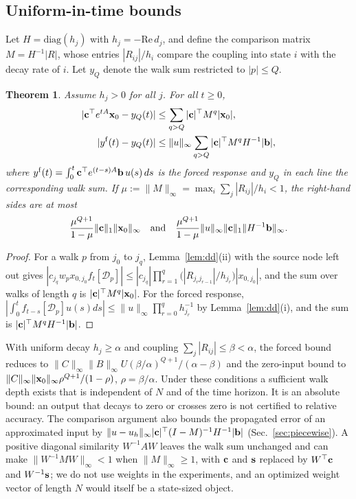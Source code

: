 \documentclass[aps,pra,superscriptaddress,floatfix,longbibliography,twocolumn]{revtex4-2}
\newcommand{\bx}{{\bf x}}
\newcommand{\bb}{{\bf b}}
\newcommand{\bc}{{\bf c}}
\newcommand{\bs}{{\bf s}}
\newtheorem{theorem}{Theorem}
\begin{document}
\subsection{Uniform-in-time bounds}
Let $H=\mathrm{diag}(h_j)$ with $h_j=-\mathrm{Re}\,d_j$, and define the comparison matrix $M=H^{-1}|R|$, whose entries $|R_{ij}|/h_i$ compare the coupling into state $i$ with the decay rate of $i$. Let $y_Q$ denote the walk sum restricted to $|p|\le Q$.
\begin{theorem}\label{thm:uniform}
Assume $h_j>0$ for all $j$. For all $t\ge0$,
\begin{align}
|\bc^\top e^{tA}\bx_0-y_Q(t)|&\le\sum_{q>Q}|\bc|^\top M^q|\bx_0|,\label{eq:uni_zi}\\
|y^{\rm f}(t)-y_Q(t)|&\le\|u\|_\infty\sum_{q>Q}|\bc|^\top M^qH^{-1}|\bb|,\label{eq:uni_f}
\end{align}
where $y^{\rm f}(t)=\int_0^t\bc^\top e^{(t-s)A}\bb\,u(s)\,ds$ is the forced response and $y_Q$ in each line the corresponding walk sum.
If $\mu:=\|M\|_\infty=\max_i\sum_j|R_{ij}|/h_i<1$, the right-hand sides are at most
\begin{equation*}
\frac{\mu^{Q+1}}{1-\mu}\|\bc\|_1\|\bx_0\|_\infty\quad\text{and}\quad\frac{\mu^{Q+1}}{1-\mu}\|u\|_\infty\|\bc\|_1\|H^{-1}\bb\|_\infty .
\end{equation*}
\end{theorem}
\begin{proof}
For a walk $p$ from $j_0$ to $j_q$, Lemma~\ref{lem:dd}(ii) with the source node left out gives $|c_{j_q}w_px_{0,j_0}f_t[\mathcal{D}_p]|\le|c_{j_q}|\prod_{r=1}^{q}\big(|R_{j_rj_{r-1}}|/h_{j_r}\big)|x_{0,j_0}|$, and the sum over walks of length $q$ is $|\bc|^\top M^q|\bx_0|$. For the forced response, $|\int_0^tf_{t-s}[\mathcal{D}_p]u(s)ds|\le\|u\|_\infty\prod_{r=0}^qh_{j_r}^{-1}$ by Lemma~\ref{lem:dd}(i), and the sum is $|\bc|^\top M^qH^{-1}|\bb|$.
\end{proof}
With uniform decay $h_j\ge\alpha$ and coupling $\sum_j|R_{ij}|\le\beta<\alpha$, the forced bound reduces to $\|C\|_\infty\|B\|_\infty U(\beta/\alpha)^{Q+1}/(\alpha-\beta)$ and the zero-input bound to $\|C\|_\infty\|\bx_0\|_\infty\rho^{Q+1}/(1-\rho)$, $\rho=\beta/\alpha$. Under these conditions a sufficient walk depth exists that is independent of $N$ and of the time horizon. It is an absolute bound: an output that decays to zero or crosses zero is not certified to relative accuracy. The comparison argument also bounds the propagated error of an approximated input by $\|u-u_h\|_\infty|\bc|^\top(I-M)^{-1}H^{-1}|\bb|$ (Sec.~\ref{sec:piecewise}). A positive diagonal similarity $W^{-1}AW$ leaves the walk sum unchanged and can make $\|W^{-1}MW\|_\infty<1$ when $\|M\|_\infty\ge1$, with $\bc$ and $\bs$ replaced by $W^\top\bc$ and $W^{-1}\bs$; we do not use weights in the experiments, and an optimized weight vector of length $N$ would itself be a state-sized object.
\end{document}
